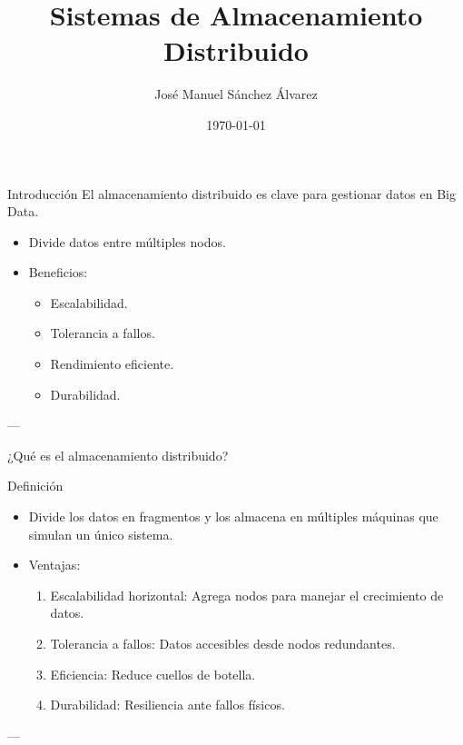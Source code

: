 \documentclass[presentation]{beamer}
\author{José Manuel Sánchez Álvarez}
\date{\today{}}
\title{Sistemas de Almacenamiento Distribuido}
\begin{document}
\maketitle

\begin{frame}[label={sec:orgc011e4e}]{Introducción}
El almacenamiento distribuido es clave para gestionar datos en Big Data.
\begin{itemize}
\item Divide datos entre múltiples nodos.
\item Beneficios:
\begin{itemize}
\item Escalabilidad.
\item Tolerancia a fallos.
\item Rendimiento eficiente.
\item Durabilidad.
\end{itemize}
\end{itemize}

---
\end{frame}

\begin{frame}[label={sec:org7d37574}]{¿Qué es el almacenamiento distribuido?}
\begin{block}{Definición}
\begin{itemize}
\item Divide los datos en fragmentos y los almacena en múltiples máquinas que simulan un único sistema.
\item Ventajas:
\begin{enumerate}
\item \alert{\alert{Escalabilidad horizontal:}} Agrega nodos para manejar el crecimiento de datos.
\item \alert{\alert{Tolerancia a fallos:}} Datos accesibles desde nodos redundantes.
\item \alert{\alert{Eficiencia:}} Reduce cuellos de botella.
\item \alert{\alert{Durabilidad:}} Resiliencia ante fallos físicos.
\end{enumerate}
\end{itemize}

---
\end{block}
\end{frame}
\end{document}
